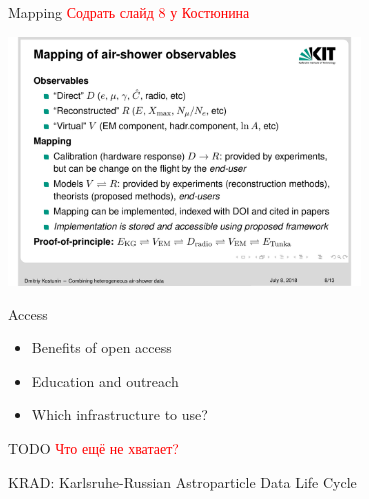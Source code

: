 \documentclass[18pt]{beamer}
\begin{document}
\begin{frame}{Mapping}
\textcolor{red}{Содрать слайд 8 у Костюнина}
\begin{center}
  \includegraphics[width=0.7\textwidth]{pics/k8.pdf}
\end{center}
\end{frame}

\begin{frame}{Access}
\begin{itemize}
  \item Benefits of open access
  \item Education and outreach
  \item Which infrastructure to use?
\end{itemize}
\end{frame}

\begin{frame}{TODO}
\textcolor{red}{Что ещё не хватает?}
\end{frame}

\begin{frame}{\textcolor{kit-green100}{KRAD}: \textcolor{kit-green100}{K}arlsruhe-\textcolor{kit-green100}{R}ussian \textcolor{kit-green100}{A}stroparticle \textcolor{kit-green100}{D}ata Life Cycle}

\end{frame}
\end{document}
